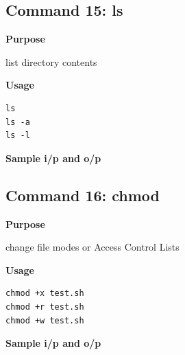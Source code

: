 \documentclass{article}
\begin{document}
\subsection{Command 15: ls} 
\textbf{Purpose}
\begin{flushleft}
 list directory contents
\end{flushleft}
\textbf{Usage}
\begin{verbatim}
ls
ls -a
ls -l
\end{verbatim}
\textbf{Sample i/p and o/p}
\begin{figure}[H] 
\end{figure}
\subsection{Command 16: chmod} 
\textbf{Purpose}
\begin{flushleft}
 change file modes or Access Control Lists
\end{flushleft}
\textbf{Usage}
\begin{verbatim}
chmod +x test.sh
chmod +r test.sh
chmod +w test.sh
\end{verbatim}
\textbf{Sample i/p and o/p}
\begin{figure}[H] 
\end{figure}
\end{document}
